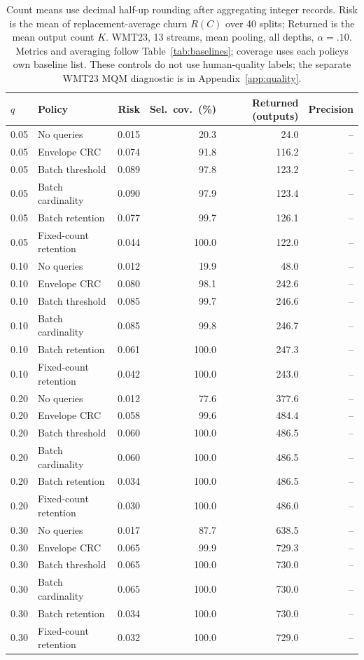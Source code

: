 \begin{table}[t]
\centering\small
\begin{tabular}{llrrrr}
\toprule
$q$ & Policy & Risk & Sel.\ cov.\ (\%) & Returned (outputs) & Precision \\
\midrule
0.05 & No queries & 0.015 & 20.3 & 24.0 & -- \\
0.05 & Envelope CRC & 0.074 & 91.8 & 116.2 & -- \\
0.05 & Batch threshold & 0.089 & 97.8 & 123.2 & -- \\
0.05 & Batch cardinality & 0.090 & 97.9 & 123.4 & -- \\
0.05 & Batch retention & 0.077 & 99.7 & 126.1 & -- \\
0.05 & Fixed-count retention & 0.044 & 100.0 & 122.0 & -- \\
0.10 & No queries & 0.012 & 19.9 & 48.0 & -- \\
0.10 & Envelope CRC & 0.080 & 98.1 & 242.6 & -- \\
0.10 & Batch threshold & 0.085 & 99.7 & 246.6 & -- \\
0.10 & Batch cardinality & 0.085 & 99.8 & 246.7 & -- \\
0.10 & Batch retention & 0.061 & 100.0 & 247.3 & -- \\
0.10 & Fixed-count retention & 0.042 & 100.0 & 243.0 & -- \\
0.20 & No queries & 0.012 & 77.6 & 377.6 & -- \\
0.20 & Envelope CRC & 0.058 & 99.6 & 484.4 & -- \\
0.20 & Batch threshold & 0.060 & 100.0 & 486.5 & -- \\
0.20 & Batch cardinality & 0.060 & 100.0 & 486.5 & -- \\
0.20 & Batch retention & 0.034 & 100.0 & 486.5 & -- \\
0.20 & Fixed-count retention & 0.030 & 100.0 & 486.0 & -- \\
0.30 & No queries & 0.017 & 87.7 & 638.5 & -- \\
0.30 & Envelope CRC & 0.065 & 99.9 & 729.3 & -- \\
0.30 & Batch threshold & 0.065 & 100.0 & 730.0 & -- \\
0.30 & Batch cardinality & 0.065 & 100.0 & 730.0 & -- \\
0.30 & Batch retention & 0.034 & 100.0 & 730.0 & -- \\
0.30 & Fixed-count retention & 0.032 & 100.0 & 729.0 & -- \\
\bottomrule
\end{tabular}
\caption{Count means use decimal half-up rounding after aggregating integer records. Risk is the mean of replacement-average churn $R(C)$ over 40 splits; Returned is the mean output count $K$. WMT23, 13 streams, mean pooling, all depths, $\alpha=.10$. Metrics and averaging follow Table~\ref{tab:baselines}; coverage uses each policy\textquotesingle s own baseline list. These controls do not use human-quality labels; the separate WMT23 MQM diagnostic is in Appendix~\ref{app:quality}.}
\label{tab:baseline-1-mean}
\end{table}
